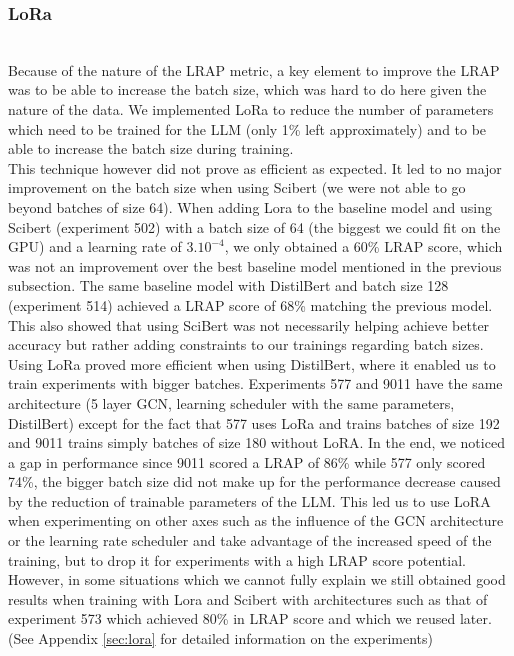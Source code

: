 \subsubsection*{LoRa}
\hfill\\
Because of the nature of the LRAP metric, a key element to improve the LRAP was to be able to increase the batch size, which was hard to do here given the nature of the data. We implemented LoRa to reduce the number of parameters which need to be trained for the LLM (only 1\% left approximately) and to be able to increase the batch size during training. 
\\ This technique however did not prove as efficient as expected. It led to no major improvement on the batch size when using Scibert (we were not able to go beyond batches of size 64). When adding Lora to the baseline model and using Scibert (experiment 502) with a batch size of 64 (the biggest we could fit on the GPU) and a learning rate of $3.10^{-4}$, we only obtained a 60\% LRAP score, which was not an improvement over the best baseline model mentioned in the previous subsection. The same baseline model with DistilBert  and batch size 128 (experiment 514) achieved a LRAP score of 68\% matching the previous model. This also showed that using SciBert was not necessarily helping achieve better accuracy but rather adding constraints to our trainings regarding batch sizes.
\newline
Using LoRa proved more efficient when using DistilBert, where it enabled us to train experiments with bigger batches. Experiments 577 and 9011 have the same architecture (5 layer GCN, learning scheduler with the same parameters, DistilBert) except for the fact that 577 uses LoRa and trains batches of size 192 and 9011 trains simply batches of size 180 without LoRA. In the end, we noticed a gap in performance since 9011 scored a LRAP of 86\% while 577 only scored 74\%, the bigger batch size did not make up for the performance decrease caused by the reduction of trainable parameters of the LLM. 
\newline
This led us to use LoRA when experimenting on other axes such as the influence of the GCN architecture or the learning rate scheduler and take advantage of the increased speed of the training, but to drop it for experiments with a high LRAP score potential. However, in some situations which we cannot fully explain we still obtained good results when training with Lora and Scibert with architectures such as that of experiment 573 which achieved 80\% in LRAP score and which we reused later.
(See Appendix \ref{sec:lora} for detailed information on the experiments)

